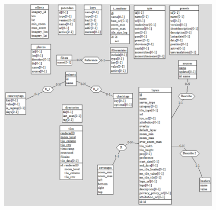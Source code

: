 \begin{figure}[!ht]
    \centering
    \includegraphics[scale=1]{images/schema_conceptuel.png}
    \label{fig:schéma conceptuel}
\end{figure}